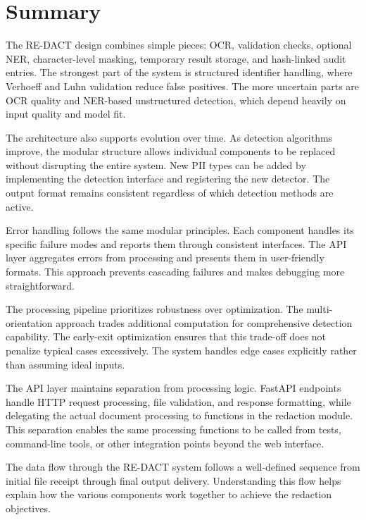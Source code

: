 \section{Summary}

The RE-DACT design combines simple pieces: OCR, validation checks, optional NER, character-level masking, temporary result storage, and hash-linked audit entries. The strongest part of the system is structured identifier handling, where Verhoeff and Luhn validation reduce false positives. The more uncertain parts are OCR quality and NER-based unstructured detection, which depend heavily on input quality and model fit.

\bigskip

The architecture also supports evolution over time. As detection algorithms improve, the modular structure allows individual components to be replaced without disrupting the entire system. New PII types can be added by implementing the detection interface and registering the new detector. The output format remains consistent regardless of which detection methods are active.

Error handling follows the same modular principles. Each component handles its specific failure modes and reports them through consistent interfaces. The API layer aggregates errors from processing and presents them in user-friendly formats. This approach prevents cascading failures and makes debugging more straightforward.

The processing pipeline prioritizes robustness over optimization. The multi-orientation approach trades additional computation for comprehensive detection capability. The early-exit optimization ensures that this trade-off does not penalize typical cases excessively. The system handles edge cases explicitly rather than assuming ideal inputs.

The API layer maintains separation from processing logic. FastAPI endpoints handle HTTP request processing, file validation, and response formatting, while delegating the actual document processing to functions in the redaction module. This separation enables the same processing functions to be called from tests, command-line tools, or other integration points beyond the web interface.

\bigskip

The data flow through the RE-DACT system follows a well-defined sequence from initial file receipt through final output delivery. Understanding this flow helps explain how the various components work together to achieve the redaction objectives.

